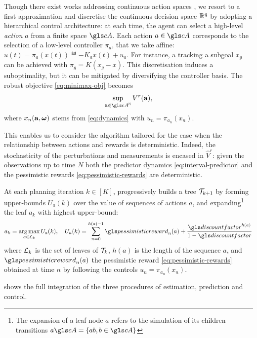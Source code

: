 Though there exist works addressing continuous action spaces \citep{Busoniu2018,Weinstein2012}, we resort to a first approximation and discretise the continuous decision space $\mathbb{R}^q$ by adopting a hierarchical control architecture: at each time, the agent can select a high-level \emph{action} $a$ from a finite space $\cA$. Each action $a\in\cA$ corresponds to the selection of a low-level controller $\pi_a$, that we take affine: $u(t) = \pi_a(x(t)) \eqdef -K_a x(t) + u_a.$ For instance, a tracking a subgoal $x_g$ can be achieved with $\pi_g = K(x_g - x)$. This discretisation induces a suboptimality, but it can be mitigated by diversifying the controller basis.
The robust objective \eqref{eq:minimax-obj} becomes
\[\sup_{\ba\in{\cA}^\Natural} V^r(\ba),\]
where $x_n(\mathbf{a}, \bm{\omega})$ stems from \eqref{eq:dynamics} with $u_n = \pi_{a_n}(x_n)$.

This enables us to consider the \OPD algorithm \citep{Hren2008} tailored for the case when the relationship between actions and rewards is deterministic. Indeed, the stochasticity of the perturbations and measurements is encased in $\hat{V}^r$: given the observations up to time $N$ both the predictor dynamics \eqref{eq:interval-predictor} and the pessimistic rewards \eqref{eq:pessimistic-rewards} are deterministic.

At each planning iteration $k\in[K]$, \OPD progressively builds a tree $\mathcal{T}_{k+1}$ by forming upper-bounds $U_a(k)$ over the value of sequences of actions $a$, and expanding\footnote{The expansion of a leaf node $a$ refers to the simulation of its children transitions $a\cA = \{ab, b\in \cA\}$} the leaf $a_k$ with highest upper-bound:
\begin{equation}
\label{eq:opd}
a_k = \argmax_{a\in\cL_k} U_a(k), \quad U_a(k) = \sum_{n=0}^{h(a)-1} \pessimisticreward_n(a) + \frac{\discount^{h(a)}}{1-\discount}
\end{equation}
where $\mathcal{L}_k$ is the set of leaves of $\mathcal{T}_k$, $h(a)$ is the length of the sequence $a$, and $\pessimisticreward_n(a)$ the pessimistic reward \eqref{eq:pessimistic-rewards} obtained at time $n$ by following the controls $u_n = \pi_{a_n}(x_n)$.

 shows the full integration of the three procedures of estimation, prediction and control. 

